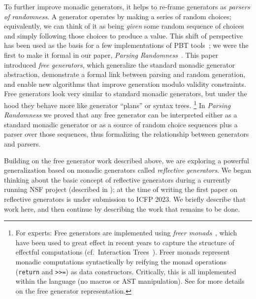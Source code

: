 To further improve monadic generators, it helps to re-frame generators as {\em
  parsers of randomness}. A generator
operates by making a series of random choices; equivalently, we can think of
it as being {\em given} some random sequence of choices and simply following
those choices to produce a value. This shift of perspective has been
used as the basis for a few implementations of PBT
tools~\cite{maciver2019hypothesis, dolan2017testing}; we were the
first to make it
formal in our paper, {\em Parsing Randomness}~\cite{goldstein2022parsing}.
%
This paper introduced {\em free generators}, which generalize the standard
monadic generator abstraction, demonstrate a formal link between parsing and
random generation, and enable new algorithms that improve
generation modulo validity constraints. Free generators look very
similar to standard monadic generators, but under the hood they behave more like
generator ``plans'' or syntax trees.%
\footnote{\normalsize For experts: Free generators are implemented using {\em freer
monads}~\cite{kiselyov2015freer}, which have been used to great effect in recent
years to capture the structure of effectful computations
(cf.~Interaction Trees~\cite{old:xia2019interaction}). Freer monads represent
monadic computations syntactically by reifying the monad operations
(\lstinline{return} and \lstinline{>>=}) as data constructors. Critically, this
is all implemented within the language (no macros or AST
manipulation). See \cite{goldstein2022parsing} for more details on the
free generator representation.}
In {\em Parsing Randomness} we proved that any free
generator can be interpreted
either as a standard monadic generator or as a source of
random choice sequences plus a parser over those sequences, thus formalizing the
relationship between generators and parsers.

Building on the free generator work described above, we are exploring a powerful
generalization based on monadic generators called {\em reflective generators}.
We began thinking about the basic concept of reflective generators during a
currently running NSF project (described in ); at the time
of writing the first paper on reflective generators is under submission to ICFP
2023.  We briefly describe that work here, and then continue by describing the
work that remains to be done.

